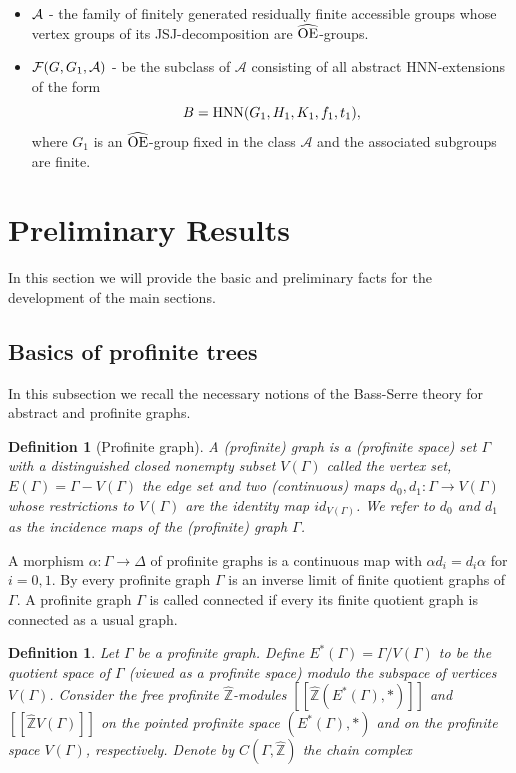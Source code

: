 \documentclass[a4paper,12pt]{article}
\newtheorem{deff}[thm]{Definition}
\newcommand{\Z}{\mathbb{Z}}
\newcommand{\A}{{\cal A}}
\newcommand{\Oe}{\rm \widehat{OE}}
\def\hnn {{\rm HNN}}
\def\Z{{\mathbb Z}}
\begin{document}
{\begin{itemize}
\item $\A$ - the family of  finitely generated residually finite accessible groups whose vertex groups of its JSJ-decomposition are $\Oe$-groups. 

\item $\mathcal F(G, G_1, \A)$ - be the subclass of $\mathcal{A}$ consisting of all abstract HNN-extensions of the form $$B=\hnn(G_1, H_1, K_1, f_1, t_1),$$ where $G_1$ is an $\Oe$-group fixed  in the class $\mathcal{A}$ and the associated subgroups are finite.

\end{itemize}


\section{\large Preliminary Results} \label{preliminares}

In this section we will provide the basic and preliminary facts for the development of the main sections. 

\subsection{Basics of profinite trees} \label{basics of trees}

In this subsection we recall the necessary notions of the Bass-Serre theory for abstract and profinite graphs.
	
	\begin{deff}[Profinite graph]
		A (profinite) graph is a (profinite space) set $\Gamma$ with a distinguished closed nonempty subset $V(\Gamma)$ called the vertex set, $E(\Gamma)=\Gamma-V(\Gamma)$ the edge set and two (continuous) maps $d_0,d_1:\Gamma \rightarrow V(\Gamma)$ whose restrictions to $V(\Gamma)$ are the identity map $id_{V(\Gamma)}$. We refer to $d_0$ and $d_1$ as the incidence maps of the (profinite) graph $\Gamma$.  
	\end{deff}
	
	A morphism $\alpha:\Gamma \longrightarrow \Delta$ of profinite graphs is a continuous map with $\alpha d_i=d_i \alpha$ for $i=0,1$. By \cite[Proposition 2.1.4]{R} every profinite graph $\Gamma$ is an inverse limit of finite quotient graphs of $\Gamma$. A profinite graph $\Gamma$ is called connected if every its finite quotient graph is connected as a usual graph. 
	
	\begin{deff}\label{Profinite tree} Let $\Gamma$ be a profinite graph. Define $E^{*}(\Gamma)=\Gamma/V(\Gamma)$ to be the quotient space of $\Gamma$ (viewed as a profinite space) modulo the subspace of vertices $V(\Gamma)$. Consider the free profinite $\widehat\Z$-modules $[[\widehat\Z(E^{*}(\Gamma),*)]]$ and $[[\widehat\Z V(\Gamma)]]$ on the pointed profinite space $(E^{*}(\Gamma),*)$ and on the profinite space $V(\Gamma)$, respectively. Denote by $C(\Gamma,\widehat\Z)$ the chain complex 
	

\end{deff}}
\end{document}
